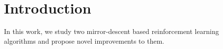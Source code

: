\chapter{Introduction}

In this work, we study two mirror-descent based reinforcement learning algorithms and propose novel
improvements to them.
